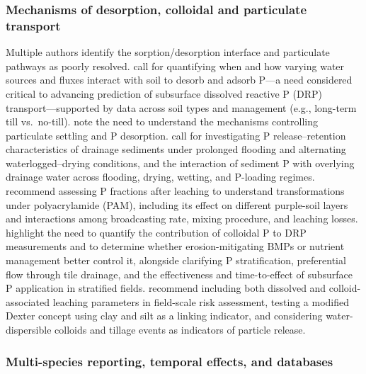 \documentclass[11pt]{article}
\begin{document}
\subsubsection{Mechanisms of desorption, colloidal and particulate transport}

Multiple authors identify the sorption/desorption interface and particulate pathways as poorly resolved. \textcite{Mumbi2025} call for quantifying when and how varying water sources and fluxes interact with soil to desorb and adsorb P---a need considered critical to advancing prediction of subsurface dissolved reactive P (DRP) transport---supported by data across soil types and management (e.g., long-term till vs.\ no-till). \textcite{Flores2021} note the need to understand the mechanisms controlling particulate settling and P desorption. \textcite{Nguyen2002} call for investigating P release--retention characteristics of drainage sediments under prolonged flooding and alternating waterlogged--drying conditions, and the interaction of sediment P with overlying drainage water across flooding, drying, wetting, and P-loading regimes. \textcite{Jiang2010} recommend assessing P fractions after leaching to understand transformations under polyacrylamide (PAM), including its effect on different purple-soil layers and interactions among broadcasting rate, mixing procedure, and leaching losses. \textcite{Wilson2019} highlight the need to quantify the contribution of colloidal P to DRP measurements and to determine whether erosion-mitigating BMPs or nutrient management better control it, alongside clarifying P stratification, preferential flow through tile drainage, and the effectiveness and time-to-effect of subsurface P application in stratified fields. \textcite{Norgaard2013} recommend including both dissolved and colloid-associated leaching parameters in field-scale risk assessment, testing a modified Dexter concept using clay and silt as a linking indicator, and considering water-dispersible colloids and tillage events as indicators of particle release.

\subsubsection{Multi-species reporting, temporal effects, and databases}
\end{document}
